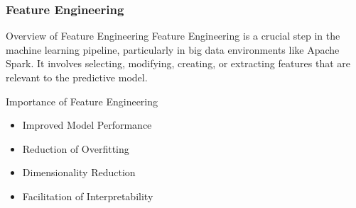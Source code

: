 \documentclass[aspectratio=169]{beamer}
\begin{document}
\begin{frame}[fragile]
    \frametitle{Feature Engineering}
    \begin{block}{Overview of Feature Engineering}
        Feature Engineering is a crucial step in the machine learning pipeline, particularly in big data environments like Apache Spark. It involves selecting, modifying, creating, or extracting features that are relevant to the predictive model.
    \end{block}
    \begin{block}{Importance of Feature Engineering}
        \begin{itemize}
            \item Improved Model Performance
            \item Reduction of Overfitting
            \item Dimensionality Reduction
            \item Facilitation of Interpretability
        \end{itemize}
    \end{block}
\end{frame}
\end{document}
